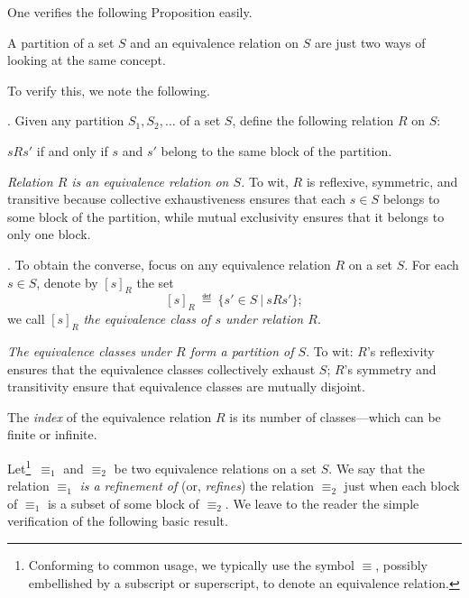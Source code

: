 One verifies the following Proposition easily. 

\begin{prop}
A partition of a set $S$ and an equivalence relation on $S$ are just
two ways of looking at the same concept.
\end{prop}

To verify this, we note the following.

.
%
Given any partition $S_1, S_2, \ldots$ of a set $S$, define the
following relation $R$ on $S$:

\noindent
$sRs'$ if and only if $s$ and $s'$ belong to the same block of the
partition.

\noindent
{\em Relation $R$ is an equivalence relation on $S$.}
To wit, $R$ is reflexive, symmetric, and transitive because collective
exhaustiveness ensures that each $s \in S$ belongs to some block of
the partition, while mutual exclusivity ensures that it belongs to
only one block.

.
%
To obtain the converse, focus on any equivalence relation $R$ on a set
$S$.  For each $s \in S$, denote by $[s]_R$ the set
\[ [s]_R \ \eqdef \ \{ s' \in S \ | \ sRs' \}; \]
we call $[s]_R$ {\it the equivalence class of $s$ under relation
$R$}.

\noindent
{\em The equivalence classes under $R$ form a partition of $S$}.
To wit: $R$'s reflexivity ensures that the equivalence classes
collectively exhaust $S$; $R$'s symmetry and transitivity ensure that
equivalence classes are mutually disjoint.

The {\it index} of the
equivalence relation $R$ is its number of classes---which can be
finite or infinite.

Let\footnote{Conforming to common usage, we typically use the symbol
  $\equiv$, possibly embellished by a subscript or superscript, to
  denote an equivalence relation.}~$\equiv_1$ and $\equiv_2$ be two
equivalence relations on a set $S$.  We say that the relation
$\equiv_1$ {\em is a refinement of} (or, {\em
  refines}) the relation
$\equiv_2$ just when each block of $\equiv_1$ is a subset of some
block of $\equiv_2$.  We leave to the reader the simple verification
of the following basic result.

